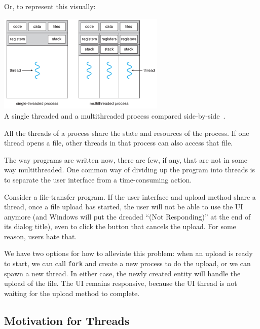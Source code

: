 \documentclass[a4paper]{report}
\begin{document}
Or, to represent this visually:

\begin{center}
	\includegraphics[width=0.6\textwidth]{images/mthread2.png}\\
	A single threaded and a multithreaded process compared side-by-side~\cite{osc}.
\end{center}

All the threads of a process share the state and resources of the process. If one thread opens a file, other threads in that process can also access that file.

The way programs are written now, there are few, if any, that are not in some way multithreaded. One common way of dividing up the program into threads is to separate the user interface from a time-consuming action.

Consider a file-transfer program. If the user interface and upload method share a thread, once a file upload has started, the user will not be able to use the UI anymore (and Windows will put the dreaded ``(Not Responding)'' at the end of its dialog title), even to click the button that cancels the upload. For some reason, users hate that. 

We have two options for how to alleviate this problem: when an upload is ready to start, we can call \texttt{fork} and create a new process to do the upload, or we can spawn a new thread. In either case, the newly created entity will handle the upload of the file. The UI remains responsive, because the UI thread is not waiting for the upload method to complete.

\subsection*{Motivation for Threads}
\end{document}
